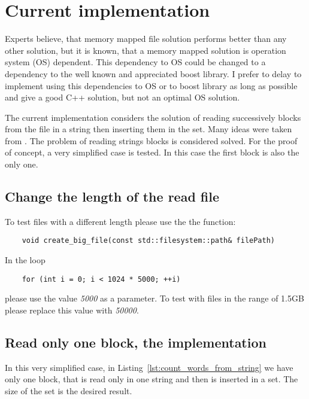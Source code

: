 \documentclass{article}
\begin{document}
\section{Current implementation}

Experts believe, that memory mapped file solution performs better than any other solution, but it is known, that a memory mapped solution is operation system (OS) dependent. This dependency to OS could be changed to a dependency to the well known and appreciated boost library.  I prefer to delay to implement using this dependencies to OS or to boost library as long as possible and give a good C++ solution, but not an optimal OS solution.  

The current implementation considers the solution of reading successively blocks from the file in a string then inserting them in the set. Many ideas were taken from \cite{WEBSITE:CppStories}. The problem of reading strings blocks is considered solved. For the proof of concept, a very simplified case is tested. In this case the first block is also the only one.

\subsection{Change the length of the read file}

To test files with a different length please use the the function: 
\begin{lstlisting}
	void create_big_file(const std::filesystem::path& filePath) 
\end{lstlisting}
In the loop
\begin{lstlisting}
   	for (int i = 0; i < 1024 * 5000; ++i)
\end{lstlisting}
please use the value \textit{5000} as a parameter. To test with files in the range of 1.5GB please replace this value with \textit{50000}.


\subsection{Read only one block, the implementation}

In this very simplified case, in Listing~\ref{lst:count_words_from_string} we have only one block, that is read only in one string and then is inserted in a set. The size of the set is the desired result.
\end{document}
